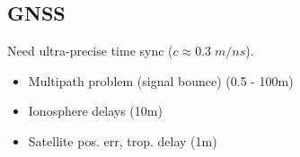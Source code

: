 \subsection{GNSS}
Need ultra-precise time sync ($c \approx 0.3\; m/ns$). 
\begin{itemize}
    \item Multipath problem (signal bounce) (0.5 - 100m)
    \item Ionosphere delays (10m)
    \item Satellite pos. err, trop. delay (1m)
\end{itemize}
